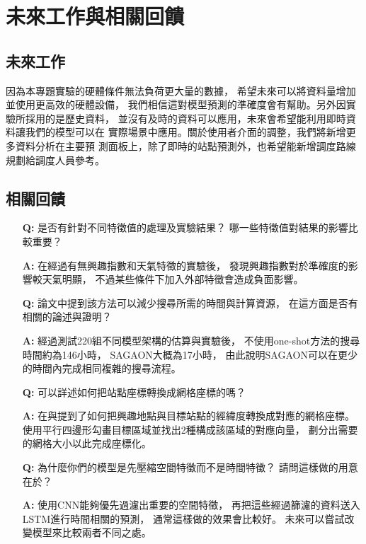 \documentclass[a4paper,14pt]{extarticle}
\begin{document}
    \newpage
    \section{未來工作與相關回饋}
        \subsection{未來工作}
            因為本專題實驗的硬體條件無法負荷更大量的數據，
            希望未來可以將資料量增加並使用更高效的硬體設備，
            我們相信這對模型預測的準確度會有幫助。另外因實驗所採用的是歷史資料，
            並沒有及時的資料可以應用，未來會希望能利用即時資料讓我們的模型可以在
            實際場景中應用。關於使用者介面的調整，我們將新增更多資料分析在主要預
            測面板上，除了即時的站點預測外，也希望能新增調度路線規劃給調度人員參考。
        \subsection{相關回饋}
            \begin{itemize}
                \item [\textbf{Q:}]
                是否有針對不同特徵值的處理及實驗結果？
                哪一些特徵值對結果的影響比較重要？
                \item [\textbf{A:}]
                在經過有無興趣指數和天氣特徵的實驗後，
                發現興趣指數對於準確度的影響較天氣明顯，
                不過某些條件下加入外部特徵會造成負面影響。
                \item [\textbf{Q:}]
                論文中提到該方法可以減少搜尋所需的時間與計算資源，
                在這方面是否有相關的論述與證明？
                \item [\textbf{A:}]
                經過測試220組不同模型架構的估算與實驗後，
                不使用one-shot方法的搜尋時間約為146小時，
                SAGAON大概為17小時，
                由此說明SAGAON可以在更少的時間內完成相同複雜的搜尋流程。
                \item [\textbf{Q:}]
                可以詳述如何把站點座標轉換成網格座標的嗎？
                \item [\textbf{A:}]
                在與提到了如何把興趣地點與目標站點的經緯度轉換成對應的網格座標。
                使用平行四邊形勾畫目標區域並找出2種構成該區域的對應向量，
                劃分出需要的網格大小以此完成座標化。
                \item [\textbf{Q:}]
                為什麼你們的模型是先壓縮空間特徵而不是時間特徵？
                請問這樣做的用意在於？
                \item [\textbf{A:}]
                使用CNN能夠優先過濾出重要的空間特徵，
                再把這些經過篩濾的資料送入LSTM進行時間相關的預測，
                通常這樣做的效果會比較好。
                未來可以嘗試改變模型來比較兩者不同之處。
            \end{itemize}
\end{document}
